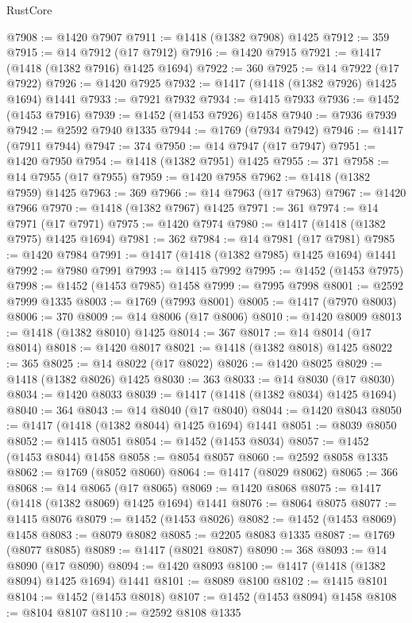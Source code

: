 \begin{lexlean}{RustCore}
\begin{coremodule}
@7908 := @1420 @7907
@7911 := @1418 (@1382 @7908) @1425
@7912 := 359
@7915 := @14 @7912 (@17 @7912)
@7916 := @1420 @7915
@7921 := @1417 (@1418 (@1382 @7916) @1425 @1694)
@7922 := 360
@7925 := @14 @7922 (@17 @7922)
@7926 := @1420 @7925
@7932 := @1417 (@1418 (@1382 @7926) @1425 @1694) @1441
@7933 := @7921 @7932
@7934 := @1415 @7933
@7936 := @1452 (@1453 @7916)
@7939 := @1452 (@1453 @7926) @1458
@7940 := @7936 @7939
@7942 := @2592 @7940 @1335
@7944 := @1769 (@7934 @7942)
@7946 := @1417 (@7911 @7944)
@7947 := 374
@7950 := @14 @7947 (@17 @7947)
@7951 := @1420 @7950
@7954 := @1418 (@1382 @7951) @1425
@7955 := 371
@7958 := @14 @7955 (@17 @7955)
@7959 := @1420 @7958
@7962 := @1418 (@1382 @7959) @1425
@7963 := 369
@7966 := @14 @7963 (@17 @7963)
@7967 := @1420 @7966
@7970 := @1418 (@1382 @7967) @1425
@7971 := 361
@7974 := @14 @7971 (@17 @7971)
@7975 := @1420 @7974
@7980 := @1417 (@1418 (@1382 @7975) @1425 @1694)
@7981 := 362
@7984 := @14 @7981 (@17 @7981)
@7985 := @1420 @7984
@7991 := @1417 (@1418 (@1382 @7985) @1425 @1694) @1441
@7992 := @7980 @7991
@7993 := @1415 @7992
@7995 := @1452 (@1453 @7975)
@7998 := @1452 (@1453 @7985) @1458
@7999 := @7995 @7998
@8001 := @2592 @7999 @1335
@8003 := @1769 (@7993 @8001)
@8005 := @1417 (@7970 @8003)
@8006 := 370
@8009 := @14 @8006 (@17 @8006)
@8010 := @1420 @8009
@8013 := @1418 (@1382 @8010) @1425
@8014 := 367
@8017 := @14 @8014 (@17 @8014)
@8018 := @1420 @8017
@8021 := @1418 (@1382 @8018) @1425
@8022 := 365
@8025 := @14 @8022 (@17 @8022)
@8026 := @1420 @8025
@8029 := @1418 (@1382 @8026) @1425
@8030 := 363
@8033 := @14 @8030 (@17 @8030)
@8034 := @1420 @8033
@8039 := @1417 (@1418 (@1382 @8034) @1425 @1694)
@8040 := 364
@8043 := @14 @8040 (@17 @8040)
@8044 := @1420 @8043
@8050 := @1417 (@1418 (@1382 @8044) @1425 @1694) @1441
@8051 := @8039 @8050
@8052 := @1415 @8051
@8054 := @1452 (@1453 @8034)
@8057 := @1452 (@1453 @8044) @1458
@8058 := @8054 @8057
@8060 := @2592 @8058 @1335
@8062 := @1769 (@8052 @8060)
@8064 := @1417 (@8029 @8062)
@8065 := 366
@8068 := @14 @8065 (@17 @8065)
@8069 := @1420 @8068
@8075 := @1417 (@1418 (@1382 @8069) @1425 @1694) @1441
@8076 := @8064 @8075
@8077 := @1415 @8076
@8079 := @1452 (@1453 @8026)
@8082 := @1452 (@1453 @8069) @1458
@8083 := @8079 @8082
@8085 := @2205 @8083 @1335
@8087 := @1769 (@8077 @8085)
@8089 := @1417 (@8021 @8087)
@8090 := 368
@8093 := @14 @8090 (@17 @8090)
@8094 := @1420 @8093
@8100 := @1417 (@1418 (@1382 @8094) @1425 @1694) @1441
@8101 := @8089 @8100
@8102 := @1415 @8101
@8104 := @1452 (@1453 @8018)
@8107 := @1452 (@1453 @8094) @1458
@8108 := @8104 @8107
@8110 := @2592 @8108 @1335

\end{coremodule}
\end{lexlean}
